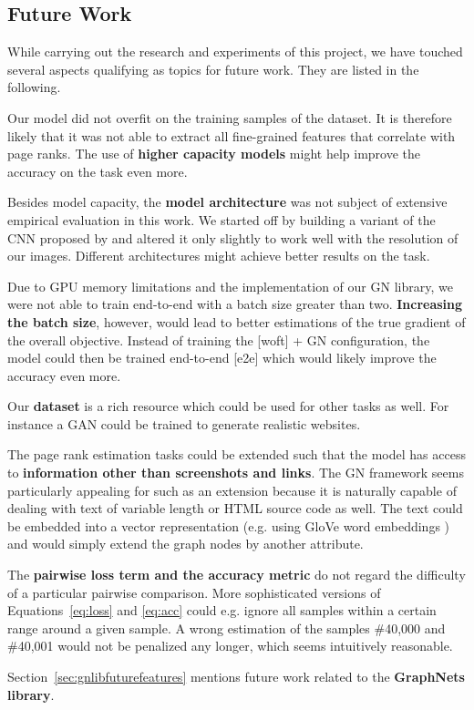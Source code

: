 \subsection{Future Work}

While carrying out the research and experiments of this project, we have touched several aspects qualifying as topics for future work. They are listed in the following.

Our model did not overfit on the training samples of the dataset. It is therefore likely that it was not able to extract all fine-grained features that correlate with page ranks. The use of \textbf{higher capacity models} might help improve the accuracy on the task even more.

Besides model capacity, the \textbf{model architecture} was not subject of extensive empirical evaluation in this work. We started off by building a variant of the CNN proposed by \cite{beltramelli:pix2code} and altered it only slightly to work well with the resolution of our images. Different architectures might achieve better results on the task.

Due to GPU memory limitations and the implementation of our GN library, we were not able to train end-to-end with a batch size greater than two. \textbf{Increasing the batch size}, however, would lead to better estimations of the true gradient of the overall objective. Instead of training the [woft] + GN configuration, the model could then be trained end-to-end [e2e] which would likely improve the accuracy even more.

Our \textbf{dataset} is a rich resource which could be used for other tasks as well. For instance a GAN \cite{goodfellow2014generative} could be trained to generate realistic websites.

The page rank estimation tasks could be extended such that the model has access to \textbf{information other than screenshots and links}. The GN framework seems particularly appealing for such as an extension because it is naturally capable of dealing with text of variable length or HTML source code as well. The text could be embedded into a vector representation (e.g. using GloVe word embeddings \cite{pennington2014:glove}) and would simply extend the graph nodes by another attribute.

The \textbf{pairwise loss term and the accuracy metric} do not regard the difficulty of a particular pairwise comparison. More sophisticated versions of Equations~\ref{eq:loss} and \ref{eq:acc} could e.g. ignore all samples within a certain range around a given sample. A wrong estimation of the samples \#40,000 and \#40,001 would not be penalized any longer, which seems intuitively reasonable.

Section~\ref{sec:gnlibfuturefeatures} mentions future work related to the \textbf{GraphNets library}.

